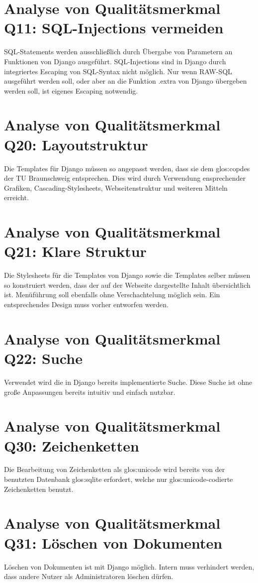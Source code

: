 \section{Analyse von Qualitätsmerkmal Q11: SQL-Injections vermeiden}

SQL-Statements werden ausschließlich durch Übergabe von Parametern an 
Funktionen von Django ausgeführt. SQL-Injections sind in Django durch 
integriertes Escaping von SQL-Syntax nicht möglich. Nur wenn RAW-SQL 
ausgeführt werden soll, oder aber an die Funktion .extra von Django 
übergeben werden soll, ist eigenes Escaping notwendig.

\section{Analyse von Qualitätsmerkmal Q20: Layoutstruktur}

Die Templates für Django müssen so angepasst werden, dass sie dem
\Gls{glos:copdes}  der TU Braunschweig entsprechen. Dies wird durch Verwendung
ensprechender Grafiken, Cascading-Stylesheets, Webseitenstruktur und weiteren
Mitteln erreicht.


\section{Analyse von Qualitätsmerkmal Q21: Klare Struktur}

Die Stylesheets für die Templates von Django sowie die Templates selber
müssen so konstruiert werden, dass der auf der Webseite dargestellte 
Inhalt übersichtlich ist. Menüführung soll ebenfalls ohne Verschachtelung
möglich sein. Ein entsprechendes Design muss vorher entworfen werden.


\section{Analyse von Qualitätsmerkmal Q22: Suche}

Verwendet wird die in Django bereits implementierte Suche. Diese Suche ist ohne
große Anpassungen bereits intuitiv und einfach nutzbar.


\section{Analyse von Qualitätsmerkmal Q30: Zeichenketten} 

Die Bearbeitung von Zeichenketten als \Gls{glos:unicode} wird bereits von der benutzten
Datenbank \Gls{glos:sqlite} erfordert, welche nur \Gls{glos:unicode}-codierte Zeichenketten benutzt.


\section{Analyse von Qualitätsmerkmal Q31: Löschen von Dokumenten} 

Löschen von Dokumenten ist mit Django möglich. Intern muss verhindert werden,
dass andere Nutzer als Administratoren löschen dürfen.
